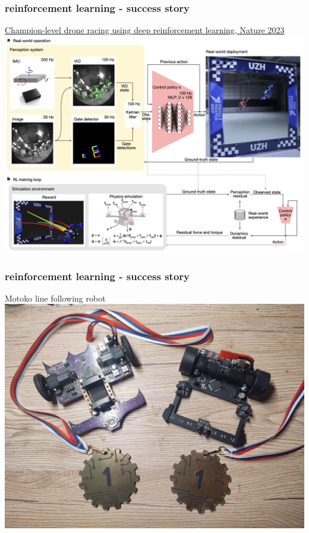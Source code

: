 \documentclass{beamer}
\begin{document}
\begin{frame}
  \frametitle{reinforcement learning - success story}
  
  \href{https://www.nature.com/articles/s41586-023-06419-4}{Champion-level drone racing using deep reinforcement learning, Nature 2023}
  \centering
  \includegraphics[scale=0.3]{../images/rl_drone.png}
    
\end{frame}


\begin{frame}
  \frametitle{reinforcement learning - success story}
  Motoko line following robot \\
  \centering
  \includegraphics[scale=0.07]{../images/medals.jpg}
    
\end{frame}
\end{document}
